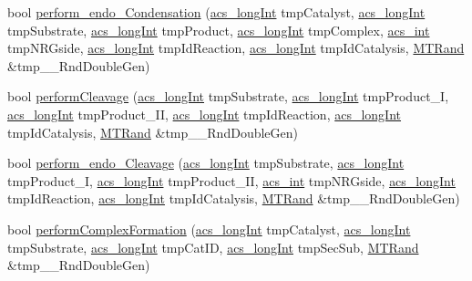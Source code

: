 \begin{DoxyCompactItemize}
\item 
bool \hyperlink{a00014_aa7a2cc95d8ba242c805a8fda063b23a7}{perform\-\_\-endo\-\_\-\-Condensation} (\hyperlink{a00072_a19319d75f02db4308bc5c0026d98cd85}{acs\-\_\-long\-Int} tmp\-Catalyst, \hyperlink{a00072_a19319d75f02db4308bc5c0026d98cd85}{acs\-\_\-long\-Int} tmp\-Substrate, \hyperlink{a00072_a19319d75f02db4308bc5c0026d98cd85}{acs\-\_\-long\-Int} tmp\-Product, \hyperlink{a00072_a19319d75f02db4308bc5c0026d98cd85}{acs\-\_\-long\-Int} tmp\-Complex, \hyperlink{a00072_a8d277355641a098190360234e2ebde35}{acs\-\_\-int} tmp\-N\-R\-Gside, \hyperlink{a00072_a19319d75f02db4308bc5c0026d98cd85}{acs\-\_\-long\-Int} tmp\-Id\-Reaction, \hyperlink{a00072_a19319d75f02db4308bc5c0026d98cd85}{acs\-\_\-long\-Int} tmp\-Id\-Catalysis, \hyperlink{a00016}{M\-T\-Rand} \&tmp\-\_\-\-\_\-\-Rnd\-Double\-Gen)
\item 
bool \hyperlink{a00014_aa4ed307a123c402166cfc7f6ed99043a}{perform\-Cleavage} (\hyperlink{a00072_a19319d75f02db4308bc5c0026d98cd85}{acs\-\_\-long\-Int} tmp\-Substrate, \hyperlink{a00072_a19319d75f02db4308bc5c0026d98cd85}{acs\-\_\-long\-Int} tmp\-Product\-\_\-\-I, \hyperlink{a00072_a19319d75f02db4308bc5c0026d98cd85}{acs\-\_\-long\-Int} tmp\-Product\-\_\-\-I\-I, \hyperlink{a00072_a19319d75f02db4308bc5c0026d98cd85}{acs\-\_\-long\-Int} tmp\-Id\-Reaction, \hyperlink{a00072_a19319d75f02db4308bc5c0026d98cd85}{acs\-\_\-long\-Int} tmp\-Id\-Catalysis, \hyperlink{a00016}{M\-T\-Rand} \&tmp\-\_\-\-\_\-\-Rnd\-Double\-Gen)
\item 
bool \hyperlink{a00014_ade26b82a3b48a5bda7e5751cbfd31b04}{perform\-\_\-endo\-\_\-\-Cleavage} (\hyperlink{a00072_a19319d75f02db4308bc5c0026d98cd85}{acs\-\_\-long\-Int} tmp\-Substrate, \hyperlink{a00072_a19319d75f02db4308bc5c0026d98cd85}{acs\-\_\-long\-Int} tmp\-Product\-\_\-\-I, \hyperlink{a00072_a19319d75f02db4308bc5c0026d98cd85}{acs\-\_\-long\-Int} tmp\-Product\-\_\-\-I\-I, \hyperlink{a00072_a8d277355641a098190360234e2ebde35}{acs\-\_\-int} tmp\-N\-R\-Gside, \hyperlink{a00072_a19319d75f02db4308bc5c0026d98cd85}{acs\-\_\-long\-Int} tmp\-Id\-Reaction, \hyperlink{a00072_a19319d75f02db4308bc5c0026d98cd85}{acs\-\_\-long\-Int} tmp\-Id\-Catalysis, \hyperlink{a00016}{M\-T\-Rand} \&tmp\-\_\-\-\_\-\-Rnd\-Double\-Gen)
\item 
bool \hyperlink{a00014_aaf4f4f6be28edb182d2a2516c9394f9b}{perform\-Complex\-Formation} (\hyperlink{a00072_a19319d75f02db4308bc5c0026d98cd85}{acs\-\_\-long\-Int} tmp\-Catalyst, \hyperlink{a00072_a19319d75f02db4308bc5c0026d98cd85}{acs\-\_\-long\-Int} tmp\-Substrate, \hyperlink{a00072_a19319d75f02db4308bc5c0026d98cd85}{acs\-\_\-long\-Int} tmp\-Cat\-I\-D, \hyperlink{a00072_a19319d75f02db4308bc5c0026d98cd85}{acs\-\_\-long\-Int} tmp\-Sec\-Sub, \hyperlink{a00016}{M\-T\-Rand} \&tmp\-\_\-\-\_\-\-Rnd\-Double\-Gen)

\end{DoxyCompactItemize}
